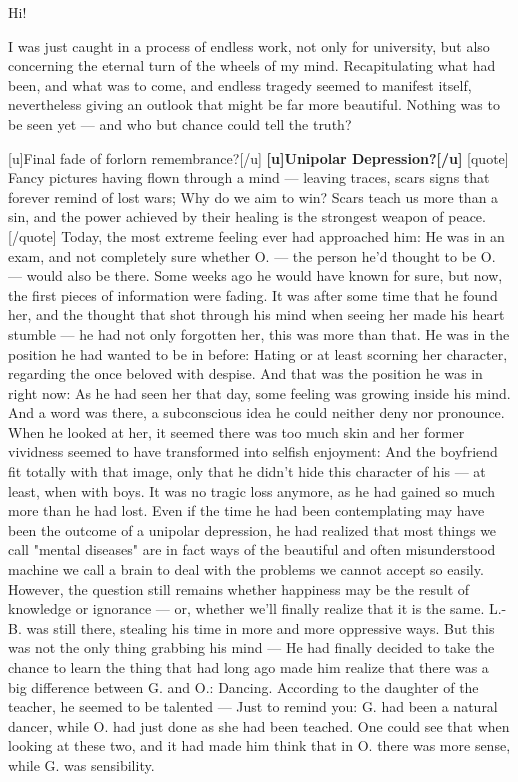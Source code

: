 Hi! 

I was just caught in a process of endless work, not only for university, but also concerning the eternal turn of the wheels of my mind. Recapitulating what had been, and what was to come, and endless tragedy seemed to manifest itself, nevertheless giving an outlook that might be far more beautiful. Nothing was to be seen yet --- and who but chance could tell the truth? 

[u]Final fade of forlorn remembrance?[/u]
\textbf{[u]Unipolar Depression?[/u]}
[quote]
Fancy pictures 
having flown through a mind --- 
leaving traces, scars 
signs that forever remind of lost wars; 
Why do we aim to win? 
Scars teach us more than a sin, 
and the power achieved by their healing 
is the strongest weapon of peace. 
[/quote]
Today, the most extreme feeling ever had approached him: He was in an exam, and not completely sure whether O. --- the person he'd thought to be O. --- would also be there. Some weeks ago he would have known for sure, but now, the first pieces of information were fading. 
It was after some time that he found her, and the thought that shot through his mind when seeing her made his heart stumble --- he had not only forgotten her, this was more than that. 
He was in the position he had wanted to be in before: Hating or at least scorning her character, regarding the once beloved with despise. 
And that was the position he was in right now: As he had seen her that day, some feeling was growing inside his mind. And a word was there, a subconscious idea he could neither deny nor pronounce. 
When he looked at her, it seemed there was too much skin and her former vividness seemed to have transformed into selfish enjoyment: And the boyfriend fit totally with that image, only that he didn't hide this character of his --- at least, when with boys. 
It was no tragic loss anymore, as he had gained so much more than he had lost. Even if the time he had been contemplating may have been the outcome of a unipolar depression, he had realized that most things we call "mental diseases" are in fact ways of the beautiful and often misunderstood machine we call a brain to deal with the problems we cannot accept so easily. However, the question still remains whether happiness may be the result of knowledge or ignorance --- or, whether we'll finally realize that it is the same. 
L.-B. was still there, stealing his time in more and more oppressive ways. But this was not the only thing grabbing his mind --- He had finally decided to take the chance to learn the thing that had long ago made him realize that there was a big difference between G. and O.: Dancing. According to the daughter of the teacher, he seemed to be talented --- Just to remind you: G. had been a natural dancer, while O. had just done as she had been teached. One could see that when looking at these two, and it had made him think that in O. there was more sense, while G. was sensibility. 
